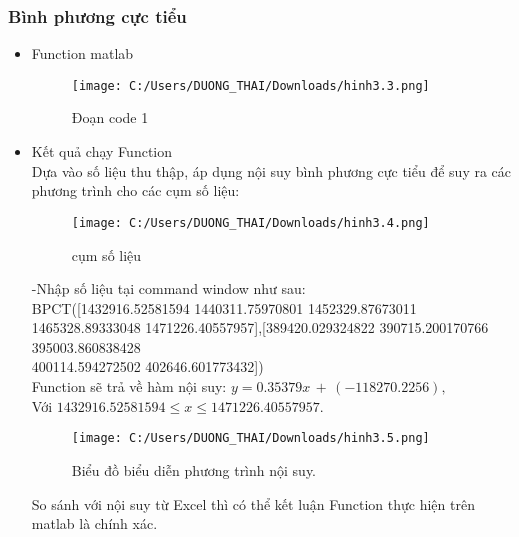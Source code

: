 \documentclass[14pt,a4paper]{article}
\begin{document}
\subsubsection{Bình phương cực tiểu}
\begin{itemize}
	\item{Function matlab}
	\begin{figure}[H]
		\centering
		\texttt{[image: C:/Users/DUONG\_THAI/Downloads/hinh3.3.png]}
		\caption[Đoạn code 1 ]{Đoạn code 1}
		\label{hinh33}
	\end{figure} \vspace{6pt}
    \item{Kết quả chạy Function \vspace{6pt} \\}
    Dựa vào số liệu thu thập, áp dụng nội suy bình phương cực tiểu để suy ra các phương trình cho các cụm số liệu:\\
    \begin{figure}[H]
    	\centering
    	\texttt{[image: C:/Users/DUONG\_THAI/Downloads/hinh3.4.png]}
    	\caption[cụm số liệu]{cụm số liệu}
    	\label{hinh34}
    \end{figure} \vspace{6pt} 
    -Nhập số liệu tại command window như sau:\vspace{6pt} \\
    BPCT([1432916.52581594 1440311.75970801 1452329.87673011 1465328.89333048 1471226.40557957],[389420.029324822 390715.200170766 395003.860838428 \\400114.594272502 402646.601773432]) \vspace{6pt}\\
    \hspace*{30pt}Function sẽ trả về hàm nội suy: ${\displaystyle y=0.35379x\,+\,(-118270.2256),}$\\  
    \hspace*{90pt} Với  ${\displaystyle 1432916.52581594 \leq x \leq 1471226.40557957.}$ \vspace{6pt}\\
    \begin{figure}[H]
    	\centering
    	\texttt{[image: C:/Users/DUONG\_THAI/Downloads/hinh3.5.png]}
    	\caption[Biểu đồ biểu diễn phương trình nội suy.]{Biểu đồ biểu diễn phương trình nội suy.}
    	\label{hinh35}
    \end{figure} \vspace{6pt} 
    \hspace*{30pt}So sánh với nội suy từ Excel thì có thể kết luận Function thực hiện trên matlab là chính xác.\vspace{6pt}\\

\end{itemize}
\end{document}
